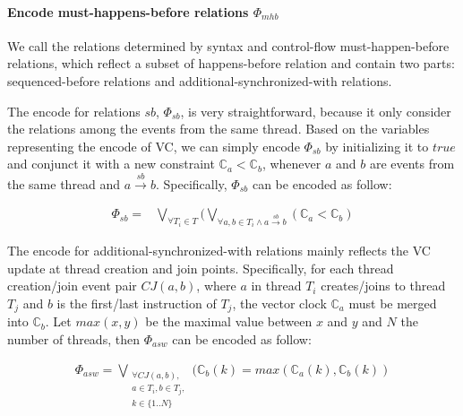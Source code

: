 \documentclass[preprint, numbers, 10pt]{sigplanconf}
\begin{document}

\paragraph{Encode must-happens-before relations $\Phi_{mhb}$}

We call the relations determined by syntax and control-flow must-happen-before relations,
which reflect a subset of happens-before relation and contain two parts: sequenced-before
relations and additional-synchronized-with relations. 

The encode for relations $sb$, $\Phi_{sb}$, is very straightforward, because it only 
consider the relations among the events from the same thread. Based on the variables representing
the encode of VC, we can simply encode $\Phi_{sb}$ by initializing it to $true$ and 
conjunct it with a new constraint $\mathbb{C}_a<\mathbb{C}_b$, whenever 
$a$ and $b$ are events from the same thread and $a \stackrel{sb}{\longrightarrow} b$.
Specifically, $\Phi_{sb}$ can be encoded as follow:

\begin{equation}
\begin{aligned}
\Phi_{sb} ={} & \bigvee_{\forall T_i\in T} (\bigvee_{\forall a,b\in T_i\wedge a \stackrel{sb}{\longrightarrow} b} 
								(\mathbb{C}_a<\mathbb{C}_b)
\end{aligned}
\end{equation}

The encode for additional-synchronized-with relations mainly reflects 
the VC update at thread creation and join points. 
Specifically, for each thread creation/join event pair $CJ(a, b)$, 
where $a$ in thread $T_i$ creates/joins to 
thread $T_j$ and $b$ is the first/last instruction of $T_j$, the vector clock 
$\mathbb{C}_a$ must be merged into $\mathbb{C}_b$. 
Let $max(x,y)$ be the maximal value between $x$ and $y$ and $N$ the
number of threads, then $\Phi_{asw}$ can be encoded as follow: 

\begin{equation}
\begin{aligned}
\Phi_{asw} =\bigvee_{\substack{\forall CJ(a,b), \\a\in T_i, b\in T_{j},\\k\in\{1..N\}}} 
					(\mathbb{C}_b(k)=max(\mathbb{C}_a(k), \mathbb{C}_b(k))
\end{aligned}
\end{equation}
\end{document}
